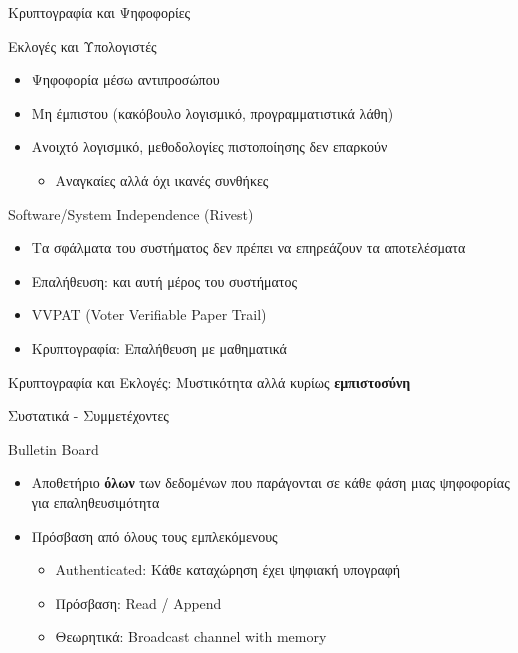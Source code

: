 \documentclass[handout]{beamer}
\begin{document}
\begin{section}{Κρυπτογραφία και Ψηφοφορίες}

\begin{frame}{Εκλογές και Υπολογιστές}
\begin{small}
\begin{itemize}
 \item Ψηφοφορία μέσω αντιπροσώπου \pause
 \item Μη έμπιστου (κακόβουλο λογισμικό, προγραμματιστικά λάθη) \pause
 \item Ανοιχτό λογισμικό, μεθοδολογίες πιστοποίησης δεν επαρκούν \pause
 \begin{itemize}
     \item Αναγκαίες αλλά όχι ικανές συνθήκες
 \end{itemize}
\end{itemize}
\begin{block}{Software/System Independence (Rivest)}
\begin{itemize}
 \item Τα σφάλματα του συστήματος δεν πρέπει να επηρεάζουν τα αποτελέσματα  
 \item Επαλήθευση: και αυτή μέρος του συστήματος \pause
 \item VVPAT (Voter Verifiable Paper Trail) \pause
 \item Κρυπτογραφία: Επαλήθευση με μαθηματικά \pause
\end{itemize}
\end{block} \pause
Κρυπτογραφία και Εκλογές: Μυστικότητα αλλά κυρίως \textbf{εμπιστοσύνη}
\end{small}
\end{frame}


\begin{frame}[allowframebreaks]{Συστατικά - Συμμετέχοντες}
\begin{block}{Bulletin Board}
\begin{itemize}
\item Αποθετήριο \textbf{όλων} των δεδομένων που παράγονται σε κάθε φάση μιας ψηφοφορίας για επαληθευσιμότητα 
\item Πρόσβαση από όλους τους εμπλεκόμενους 
\begin{itemize}
\item Authenticated: Κάθε καταχώρηση έχει ψηφιακή υπογραφή 
\item Πρόσβαση: Read / Append 
\item Θεωρητικά: Broadcast channel with memory
\end{itemize}
\end{itemize}
\end{block}


\end{frame}
\end{section}
\end{document}
